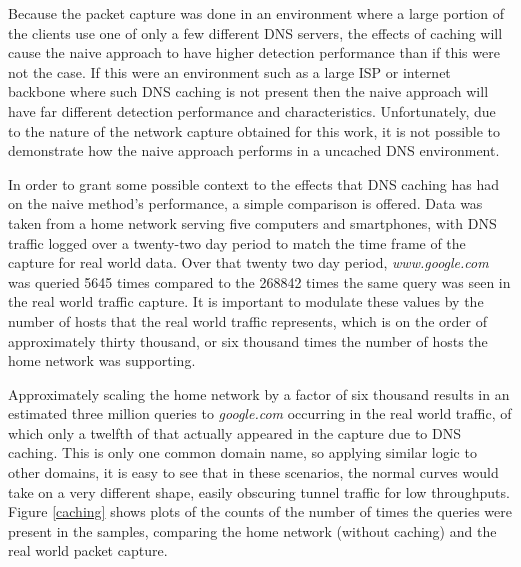 \documentclass[12pt]{report}
\theoremstyle{remark}
\theoremstyle{definition}
\theoremstyle{definition}
\theoremstyle{definition}
\begin{document}
Because the packet capture was done in an environment where a large portion of
the clients use one of only a few different DNS servers, the effects of caching
will cause the naive approach to have higher detection performance than if this were not the case. If this were
an environment such as a large ISP or internet backbone where such DNS caching
is not present then the naive approach will have far different detection
performance and characteristics. Unfortunately, due to the nature of the network
capture obtained for this work, it is not possible to demonstrate how the naive
approach performs in a uncached DNS environment.

In order to grant some possible context to the effects that DNS caching has had
on the naive method's performance, a simple comparison is offered. Data was
taken from a home network serving five computers and smartphones, with DNS
traffic logged over a twenty-two day period to match the time frame of the
capture for real world data. Over that twenty two day period,
\emph{www.google.com} was queried 5645 times compared to the 268842 times the
same query was seen in the real world traffic capture. It is important to modulate these
values by the number of hosts that the real world traffic represents, which
is on the order of approximately thirty thousand, or six thousand times the
number of hosts the home network was supporting.

Approximately scaling the home network by a factor of six thousand results in an
estimated three million queries to \emph{google.com} occurring in the real world
traffic, of which only a twelfth of that actually appeared in the capture due to
DNS caching. This is only one common domain name, so applying similar logic to
other domains, it is easy to see that in these scenarios, the normal curves
would take on a very different shape, easily obscuring tunnel traffic for low
throughputs. Figure \ref{caching} shows plots of the counts of the number of times the queries were present in the samples, comparing the home network (without caching) and the real world packet capture.
\end{document}
